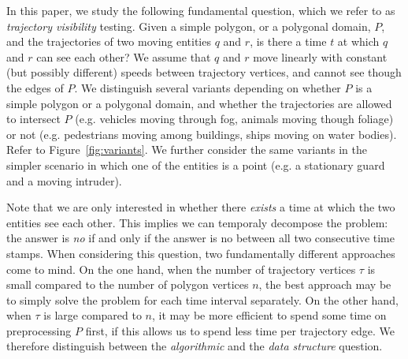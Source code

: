 \documentclass[UKenglish]{lipics-v2019}
\newcommand{\myremark}[4]{\textcolor{blue}{\textsc{#1 #2:}} \textcolor{#4}{\textsf{#3}}}
\newcommand{\maarten}[2][says]{\myremark{Maarten}{#1}{#2}{Red}}
\renewcommand{\myremark}[4]{}
\begin{document}
In this paper, we study the following fundamental question, which we refer to as {\em trajectory visibility} testing.
  Given a simple polygon, or a polygonal domain, $P$, and the trajectories of two moving entities $q$ and $r$, is there a time $t$ at which $q$ and $r$ can see each other?
  We assume that $q$ and $r$ move linearly with constant (but possibly different) speeds between trajectory vertices, and cannot see though the edges of $P$.
  We distinguish several variants depending on whether $P$ is a simple polygon or a polygonal domain, and whether the trajectories are allowed to intersect $P$ (e.g. vehicles moving through fog, animals moving though foliage) or not (e.g. pedestrians moving among buildings, ships moving on water bodies). Refer to Figure~\ref {fig:variants}.
  We further consider the same variants in the simpler scenario in which one of the entities is a point (e.g. a stationary guard and a moving intruder).
%

Note that we are only interested in whether there {\em
  exists} a time at which the two entities see each other. %
This implies we can temporaly decompose the problem: the answer is {\em no} if and only if the answer is no between all two consecutive time stamps.
When considering this question, two fundamentally different approaches come to mind.
On the one hand, when the number of trajectory vertices $\tau$ is small compared to the number of polygon vertices $n$, the best approach may be to simply solve the problem for each time interval separately. 
On the other hand, when $\tau$ is large compared to $n$, it may be more efficient to spend some time on preprocessing $P$ first, if this allows us to spend less time per trajectory edge.
We therefore distinguish between the {\em algorithmic} and the {\em data structure} question. 
\end{document}
